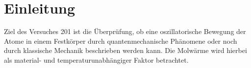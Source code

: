 \section{Einleitung}
\label{sec:Einleitung}

Ziel des Versuches 201 ist die Überprüfung, ob eine oszillatorische Bewegung
der Atome in einem Festkörper durch quantenmechanische Phänomene oder noch durch
klassische Mechanik beschrieben werden kann. Die Molwärme wird hierbei als material- und
temperaturunabhängiger Faktor betrachtet.

